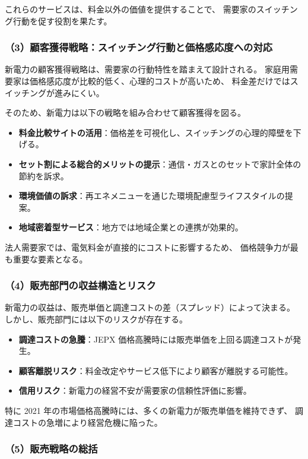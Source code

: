 これらのサービスは、料金以外の価値を提供することで、
需要家のスイッチング行動を促す役割を果たす。

\subsubsection{（3）顧客獲得戦略：スイッチング行動と価格感応度への対応}

新電力の顧客獲得戦略は、需要家の行動特性を踏まえて設計される。
家庭用需要家は価格感応度が比較的低く、心理的コストが高いため、
料金差だけではスイッチングが進みにくい。

そのため、新電力は以下の戦略を組み合わせて顧客獲得を図る。

\begin{itemize}
  \item \textbf{料金比較サイトの活用}：価格差を可視化し、スイッチングの心理的障壁を下げる。
  \item \textbf{セット割による総合的メリットの提示}：通信・ガスとのセットで家計全体の節約を訴求。
  \item \textbf{環境価値の訴求}：再エネメニューを通じた環境配慮型ライフスタイルの提案。
  \item \textbf{地域密着型サービス}：地方では地域企業との連携が効果的。
\end{itemize}

法人需要家では、電気料金が直接的にコストに影響するため、
価格競争力が最も重要な要素となる。

\subsubsection{（4）販売部門の収益構造とリスク}

新電力の収益は、販売単価と調達コストの差（スプレッド）によって決まる。
しかし、販売部門には以下のリスクが存在する。

\begin{itemize}
  \item \textbf{調達コストの急騰}：JEPX 価格高騰時には販売単価を上回る調達コストが発生。
  \item \textbf{顧客離脱リスク}：料金改定やサービス低下により顧客が離脱する可能性。
  \item \textbf{信用リスク}：新電力の経営不安が需要家の信頼性評価に影響。
\end{itemize}

特に 2021 年の市場価格高騰時には、多くの新電力が販売単価を維持できず、
調達コストの急増により経営危機に陥った。

\subsubsection{（5）販売戦略の総括}

